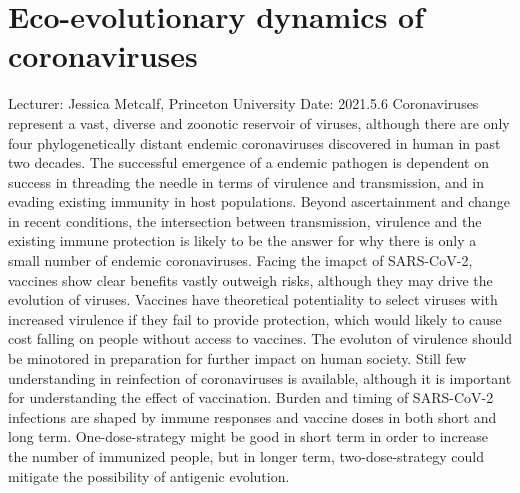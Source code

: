 \documentclass[11pt]{article}
\begin{document}
  \section{Eco-evolutionary dynamics of coronaviruses}
  Lecturer: Jessica Metcalf, Princeton University
  \newline
  Date: 2021.5.6
  \newline
  Coronaviruses represent a vast, diverse and zoonotic reservoir of viruses, although there are only four phylogenetically distant endemic coronaviruses discovered in human in past two decades. 
  The successful emergence of a endemic pathogen is dependent on success in threading the needle in terms of virulence and transmission, and in evading existing immunity in host populations. 
  Beyond ascertainment and change in recent conditions, the intersection between transmission, virulence and the existing immune protection is likely to be the answer for why there is only a small number of endemic coronaviruses.
  \newline
  Facing the imapct of SARS-CoV-2, vaccines show clear benefits vastly outweigh risks, although they may drive the evolution of viruses. 
  Vaccines have theoretical potentiality to select viruses with increased virulence if they fail to provide protection, which would likely to cause cost falling on people without access to vaccines. 
  The evoluton of virulence should be minotored in preparation for further impact on human society.
  \newline
  Still few understanding in reinfection of coronaviruses is available, although it is important for understanding the effect of vaccination. 
  Burden and timing of SARS-CoV-2 infections are shaped by immune responses and vaccine doses in both short and long term. 
  One-dose-strategy might be good in short term in order to increase the number of immunized people, but in longer term, two-dose-strategy could mitigate the possibility of antigenic evolution.

  \newpage
\end{document}
